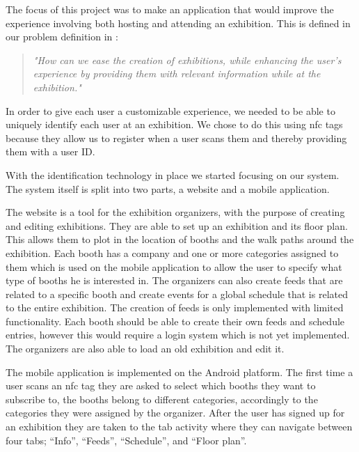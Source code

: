 The focus of this project was to make an application that would improve the experience involving both hosting and attending an exhibition.
This is defined in our problem definition in :
\begin{quote}
\textit{"How can we ease the creation of exhibitions, while enhancing the user's experience by providing them with relevant information while at the exhibition."}
\end{quote}
In order to give each user a customizable experience, we needed to be able to uniquely identify each user at an exhibition. We chose to do this using \ac{nfc} tags because they allow us to register when a user scans them and thereby providing them with a user ID.
 
With the identification technology in place we started focusing on our system. The system itself is split into two parts, a website and a mobile application.

The website is a tool for the exhibition organizers, with the purpose of creating and editing exhibitions. They are able to set up an exhibition and its floor plan. This allows them to plot in the location of booths and the walk paths around the exhibition. Each booth has a company and one or more categories assigned to them which is used on the mobile application to allow the user to specify what type of booths he is interested in. The organizers can also create feeds that are related to a specific booth and create events for a global schedule that is related to the entire exhibition. The creation of feeds is only implemented with limited functionality. Each booth should be able to create their own feeds and schedule entries, however this would require a login system which is not yet implemented. The organizers are also able to load an old exhibition and edit it.

The mobile application is implemented on the Android platform. The first time a user scans an \ac{nfc} tag they are asked to select which booths they want to subscribe to, the booths belong to different categories, accordingly to the categories they were assigned by the organizer. After the user has signed up for an exhibition they are taken to the tab activity where they can navigate between four tabs; ``Info'', ``Feeds'', ``Schedule'', and ``Floor plan''.

